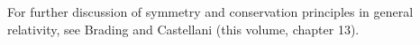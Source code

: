 \documentclass [12] {article}
\theoremstyle{plain}
\numberwithin{figure}{subsection}
\numberwithin{proposition}{subsection}
\begin{document}
   For further discussion of symmetry and conservation principles in general relativity, see Brading and Castellani (this volume, chapter 13).




\end{document}
